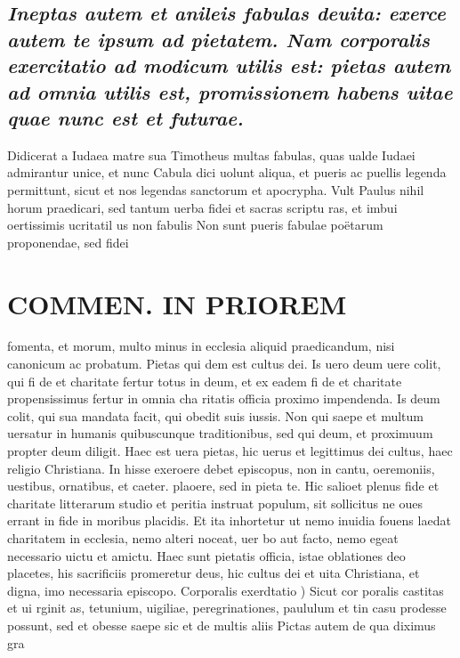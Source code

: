 \documentclass{article}
\begin{document}
\begin{pages}
\subsection*{\textit{Ineptas autem et anileis fabulas deuita: exerce autem te ipsum ad pietatem. Nam corporalis exercitatio ad modicum utilis est: pietas autem ad omnia utilis est, promissionem habens uitae quae nunc est et futurae. }}\pstart Didicerat a Iudaea matre sua Timotheus multas fabulas, quas ualde Iudaei admirantur unice, et nunc Cabula dici uolunt aliqua, et pueris ac puellis legenda permittunt, sicut et nos legendas sanctorum et apocrypha. Vult Paulus nihil horum praedicari, sed tantum uerba fidei et sacras scriptu ras, et imbui oertissimis ucritatil us non fabulis Non sunt pueris fabulae poëtarum proponendae, sed fidei  \pend
\section*{COMMEN. IN PRIOREM }
\marginpar{[ p.104 ]}\pstart fomenta, et morum, multo minus in ecclesia aliquid praedicandum, nisi canonicum ac probatum. Pietas qui dem est cultus dei. Is uero deum uere colit, qui fi de et charitate fertur totus in deum, et ex eadem fi de et charitate propensissimus fertur in omnia cha ritatis officia proximo impendenda. Is deum colit, qui sua mandata facit, qui obedit suis iussis. Non qui saepe et multum uersatur in humanis quibuscunque  traditionibus, sed qui deum, et proximuum propter deum diligit. Haec est uera pietas, hic uerus et legittimus dei cultus, haec religio Christiana. In hisse exeroere debet episcopus, non in cantu, oeremoniis, uestibus, ornatibus, et caeter. plaoere, sed in pieta te. Hic salioet plenus fide et charitate litterarum studio et peritia instruat populum, sit sollicitus ne oues errant in fide in moribus placidis. Et ita inhortetur ut nemo inuidia fouens laedat charitatem in ecclesia, nemo alteri noceat, uer bo aut facto, nemo egeat necessario uictu et amictu. Haec sunt pietatis officia, istae oblationes deo placetes, his sacrificiis promeretur deus, hic cultus dei et uita Christiana, et digna, imo necessaria episcopo.  \pend\pstart Corporalis exerdtatio ) Sicut cor poralis castitas et ui rginit as, tetunium, uigiliae, peregrinationes, paululum et tin casu prodesse possunt, sed et obesse saepe sic et de multis aliis Pictas autem de qua diximus gra  \pend

\end{pages}
\end{document}
